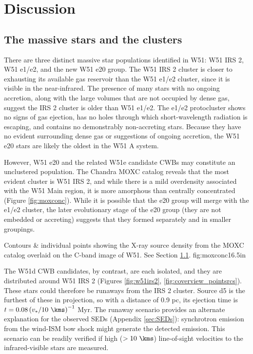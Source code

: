 \section{Discussion}
\label{sec:discussion}

\subsection{The massive stars and the clusters}
\label{sec:mstarscluster}
There are three distinct massive star populations identified in W51: W51 IRS 2,
W51 e1/e2, and the new W51 e20 group.  The W51 IRS 2 cluster is closer to
exhausting its available gas reservoir than the W51 e1/e2 cluster, since it is
visible in the near-infrared.  The presence of many stars with no ongoing
accretion, along with the large volumes that are not occupied by dense gas,
suggest the IRS 2 cluster is older than W51 e1/e2. The e1/e2 protocluster shows
no signs of gas ejection, has no holes through which short-wavelength radiation
is escaping, and contains no demonstrably non-accreting stars.  
Because they have no evident surrounding dense gas or suggestions of ongoing
accretion, the W51 e20 stars are likely the oldest in the W51 A system.

However, W51 e20 and the related W51e candidate CWBs may constitute an
unclustered population.  The Chandra MOXC catalog \citep{Townsley2014a} reveals
that the most evident cluster is W51 IRS 2, and while there is a mild
overdensity associated with the W51 Main region, it is more amorphous than
centrally concentrated (Figure \ref{fig:moxconc}).  While it is possible that
the e20 group will merge with the e1/e2 cluster, the later evolutionary stage
of the e20 group (they are not embedded or accreting) suggests that they formed
separately and in smaller groupings.

{Contours \& individual points showing the X-ray source density from the 
MOXC \citep{Townsley2014a} catalog overlaid on the C-band image of W51.
See Section \ref{sec:mstarscluster}.}
{fig:moxconc}{1}{6.5in}

The W51d CWB candidates, by contrast, are each isolated, and they are
distributed around W51 IRS 2 (Figures \ref{fig:w51irs2},
\ref{fig:coverview_pointsrcs}).  These stars could therefore be runaways from
the IRS 2 cluster.  Source d5 is the furthest of these in projection, so with a
distance of 0.9 pc, its ejection time is $t = 0.08 \left({v_*}/{10
~\kms}\right)^{-1}$ Myr.  The runaway scenario provides an alternate
explanation for the observed SEDs (Appendix \ref{sec:SEDs}): synchrotron
emission from the wind-ISM bow shock might generate the detected emission.
This scenario can be readily verified if high ($>10~\kms$) line-of-sight
velocities to the infrared-visible stars are measured.


